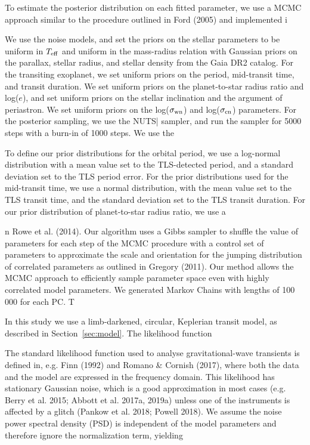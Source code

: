 \documentclass[floatfix,ApJL,twocolumn]{aastex631}
\begin{document}
To estimate the posterior distribution on each fitted
parameter, we use a MCMC approach similar to the
procedure outlined in Ford (2005) and implemented i

We use the  noise models, and set the priors on the stellar parameters to be uniform in $T_{\rm eff}$ and uniform in the mass-radius relation with Gaussian priors on the parallax, stellar radius, and stellar density from the Gaia DR2 catalog.  For the transiting exoplanet, we set uniform priors on the period, mid-transit time, and transit duration.  We set uniform priors on the planet-to-star radius ratio and log($e$), and set uniform priors on the stellar inclination and the argument of periastron.  We set uniform priors on the log($\sigma_{\rm wn}$) and log($\sigma_{\rm cn}$) parameters.  For the posterior sampling, we use the NUTS| sampler, and run the sampler for 5000 steps with a burn-in of 1000 steps.  We use the 

To define our prior distributions for the orbital period, we use a log-normal distribution with a mean value set to the TLS-detected period, and a
standard deviation set to the TLS period error. For the prior
distributions used for the mid-transit time, we use a normal
distribution, with the mean value set to the TLS transit time,
and the standard deviation set to the TLS transit duration. For
our prior distribution of planet-to-star radius ratio, we use a

n
Rowe et al. (2014). Our algorithm uses a Gibbs sampler to shuffle the value of parameters for each step of
the MCMC procedure with a control set of parameters
to approximate the scale and orientation for the jumping
distribution of correlated parameters as outlined in Gregory (2011). Our method allows the MCMC approach to
efficiently sample parameter space even with highly correlated model parameters. We generated Markov Chains
with lengths of 100 000 for each PC. T




In this study we use a limb-darkened, circular, Keplerian transit model, as described in Section~\ref{sec:model}. 
The likelihood function 

The standard likelihood function used to analyse gravitational-wave transients is defined in, e.g. Finn (1992) and Romano \& Cornish (2017), where both the data and the model are expressed in the frequency domain. This likelihood has stationary Gaussian noise, which is a good approximation in most cases (e.g. Berry et al. 2015; Abbott et al. 2017a, 2019a) unless one of the instruments is affected by a glitch (Pankow et al. 2018; Powell 2018). We assume the noise power spectral density (PSD) is independent of the model parameters and therefore ignore the normalization term, yielding
\end{document}
